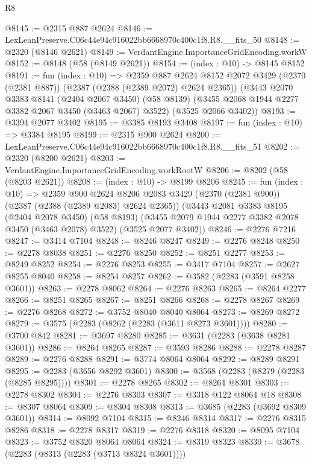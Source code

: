 \begin{lexlean}{R8}
\begin{coremodule}
@8145 := @2315 @887 @2624
@8146 := LexLeanPreserve.C06c44e94c916022bb6668970c400c1f8.R8.__fits_50
@8148 := @2320 (@8146 @2621)
@8149 := VerdantEngine.ImportanceGridEncoding.workW
@8152 := @8148 (@58 (@8149 @2621))
@8154 := (index : @10) -> @8145 @8152
@8191 := fun (index : @10) =>
  @2359
    @887
    @2624
    @8152
    @2072
    @3429
    (@2370 (@2381 @887))
    (@2387 (@2388 (@2389 @2072) @2624 @2365))
    (@3443
      @2070
      @3383
      @8141
      (@2404 @2067 @3450)
      (@58 @8139)
      (@3455 @2068 @1944 @2277 @3382 @2067 @3450 (@3463 @2067) @3522)
      (@3525 @2066 @3402))
@8193 := @3394 @2077 @3402
@8195 := @3385 @8193 @3408
@8197 := fun (index : @10) => @3384 @8195
@8199 := @2315 @900 @2624
@8200 := LexLeanPreserve.C06c44e94c916022bb6668970c400c1f8.R8.__fits_51
@8202 := @2320 (@8200 @2621)
@8203 := VerdantEngine.ImportanceGridEncoding.workRootW
@8206 := @8202 (@58 (@8203 @2621))
@8208 := (index : @10) -> @8199 @8206
@8245 := fun (index : @10) =>
  @2359
    @900
    @2624
    @8206
    @2083
    @3429
    (@2370 (@2381 @900))
    (@2387 (@2388 (@2389 @2083) @2624 @2365))
    (@3443
      @2081
      @3383
      @8195
      (@2404 @2078 @3450)
      (@58 @8193)
      (@3455 @2079 @1944 @2277 @3382 @2078 @3450 (@3463 @2078) @3522)
      (@3525 @2077 @3402))
@8246 := @2276 @7216
@8247 := @3414 @7104
@8248 := @8246 @8247
@8249 := @2276 @8248
@8250 := @2278 @8038
@8251 := @2276 @8250
@8252 := @8251 @2277
@8253 := @8249 @8252
@8254 := @2276 @8253
@8255 := @3417 @7104
@8257 := @2627 @8255 @8040
@8258 := @8254 @8257
@8262 := @3582 (@2283 (@3591 @8258 @3601))
@8263 := @2278 @8062
@8264 := @2276 @8263
@8265 := @8264 @2277
@8266 := @8251 @8265
@8267 := @8251 @8266
@8268 := @2278 @8267
@8269 := @2276 @8268
@8272 := @3752 @8040 @8040 @8064
@8273 := @8269 @8272
@8279 := @3575 (@2283 (@8262 (@2283 (@3611 @8273 @3601))))
@8280 := @3700 @842
@8281 := @3697 @8280
@8285 := @3631 (@2283 (@3638 @8281 @3601))
@8286 := @8264 @8265
@8287 := @3593 @8286
@8288 := @2278 @8287
@8289 := @2276 @8288
@8291 := @3774 @8064 @8064
@8292 := @8289 @8291
@8295 := @2283 (@3656 @8292 @3601)
@8300 := @3568 (@2283 (@8279 (@2283 (@8285 @8295))))
@8301 := @2278 @8265
@8302 := @8264 @8301
@8303 := @2278 @8302
@8304 := @2276 @8303
@8307 := @3318 @122 @8064 @18
@8308 := @8307 @8064
@8309 := @8304 @8308
@8313 := @3685 (@2283 (@3692 @8309 @3601))
@8314 := @8092 @7104
@8315 := @8246 @8314
@8317 := @2276 @8315 @8286
@8318 := @2278 @8317
@8319 := @2276 @8318
@8320 := @8095 @7104
@8323 := @3752 @8320 @8064 @8064
@8324 := @8319 @8323
@8330 := @3678 (@2283 (@8313 (@2283 (@3713 @8324 @3601))))

\end{coremodule}
\end{lexlean}
